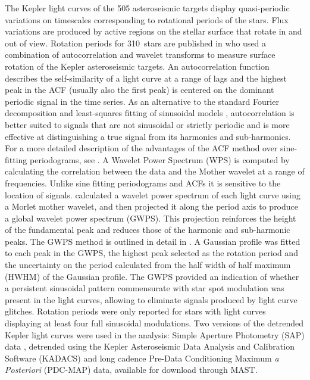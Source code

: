 \documentclass[10pt,preprint]{aastex}
\newcommand{\ngarcia}{310~}
\begin{document}
The Kepler light curves of the 505 asteroseismic targets display quasi-periodic variations on timescales corresponding to rotational periods of the stars.
Flux variations are produced by active regions on the stellar surface that rotate in and out of view.
Rotation periods for \ngarcia stars are published in \citet{Garcia2014} who used a combination of autocorrelation and wavelet transforms to measure surface rotation of the Kepler asteroseismic targets.
An autocorrelation function describes the self-similarity of a light curve at a range of lags and the highest peak in the ACF (usually also the first peak) is centered on the dominant periodic signal in the time series.
As an alternative to the standard Fourier decomposition and least-squares fitting of sinusoidal models \citep{Zechmeister}, autocorrelation is better suited to signals that are not sinusoidal or strictly periodic and is more effective at distinguishing a true signal from its harmonics and sub-harmonics.
For a more detailed description of the advantages of the ACF method over sine-fitting periodograms, see \citet{McQuillan}.
A Wavelet Power Spectrum (WPS) is computed by calculating the correlation between the data and the Mother wavelet at a range of frequencies.
Unlike sine fitting periodograms and ACFs it is sensitive to the location of signals.
\citet{Garcia2014} calculated a wavelet power spectrum of each light curve using a Morlet mother wavelet, and then projected it along the period axis to produce a global wavelet power spectrum (GWPS).
This projection reinforces the height of the fundamental peak and reduces those of the harmonic and sub-harmonic peaks.
The GWPS method is outlined in detail in \citep{Mathur2014}.
A Gaussian profile was fitted to each peak in the GWPS, the highest peak selected as the rotation period and the uncertainty on the period calculated from the half width of half maximum (HWHM) of the Gaussian profile.
The GWPS provided an indication of whether a persistent sinusoidal pattern commensurate with star spot modulation was present in the light curves, allowing \citet{Garcia2014} to eliminate signals produced by light curve glitches.
Rotation periods were only reported for stars with light curves displaying at least four full sinusoidal modulations.
Two versions of the detrended Kepler light curves were used in the analysis: Simple Aperture Photometry (SAP) data \citep{Thompson2013}, detrended using the Kepler Asteroseismic Data Analysis and Calibration Software (KADACS) \citep{Garcia2011} and long cadence Pre-Data Conditioning Maximum \emph{a Posteriori} (PDC-MAP) data, available for download through MAST.
\end{document}
